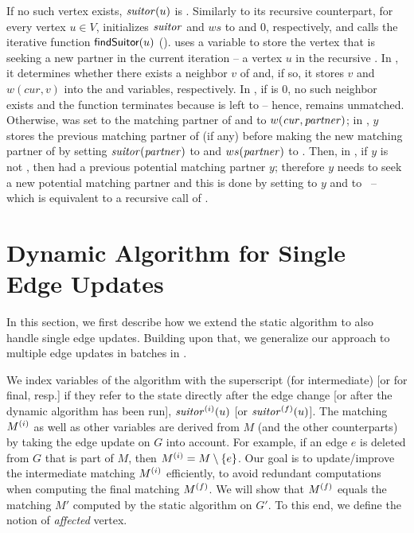 If no such vertex exists, $\mathit{suitor}(u)$ is \nil. Similarly to its recursive
counterpart, for every vertex $u\in V$,  initializes
$\mathit{suitor}$ and $ws$ to \nil and $0$, respectively, and calls the iterative
function $\textsf{findSuitor}(u)$ (). \findsuitor uses a
variable \cur to store the vertex that is seeking a new partner in the current
iteration -- \ie a vertex $u$ in the recursive \findsuitor.
In ,
it determines whether there exists a neighbor $v$ of \cur and, if so, it stores
$v$ and $w(cur, v)$ into the \partner and \heaviest variables, respectively.
In , if \heaviest is $0$, no such neighbor
exists and the function terminates because \done is left to \true -- hence,
\cur remains unmatched. Otherwise, \partner was set to the matching partner of
\cur and \heaviest to $w(\mathit{cur}, \mathit{partner})$; in
, $y$
stores the previous matching partner of \partner (if any) before making \cur the
new matching partner of \partner by setting $\mathit{suitor}(\mathit{partner})$ to \cur and
$ws(\mathit{partner})$ to \heaviest. Then, in
, if $y$ is
not \nil, then \partner had a previous potential matching partner $y$; therefore $y$
needs to seek a new potential matching partner and this is done by setting \cur to
$y$ and \done to \false\ -- which is equivalent to a recursive call of
.

\section{Dynamic \suitor Algorithm for Single Edge Updates}
\label{sec:dyn-mwm:dyn-suitor-single}
%
In this section, we first describe how we extend the static \suitor algorithm to
also handle single edge updates. Building upon that, we generalize our approach
to multiple edge updates in batches in .

We index variables of the \suitor algorithm with the superscript \interm
(for intermediate) [or \final for final, resp.] if they refer to the state directly
after the edge change [or after the dynamic \suitor algorithm has been run], \eg
$\mathit{suitor}^{(i)}(u)$ [or $\mathit{suitor}^{(f)}(u)$].
The matching $M^{(i)}$ as well as other \suitor variables are derived from $M$
(and the other counterparts) by taking the edge update on $G$ into account.
For example, if an edge $e$ is deleted from $G$ that is part of $M$, then
$M\interm = M\setminus\set{e}$. Our goal is to update/improve the intermediate
matching $M^{(i)}$ efficiently, \ie to avoid redundant computations when computing
the final matching $M^{(f)}$. We will show that $M^{(f)}$ equals the matching $M'$
computed by the static \suitor algorithm on $G'$. To this end, we define the notion
of \emph{affected} vertex.

